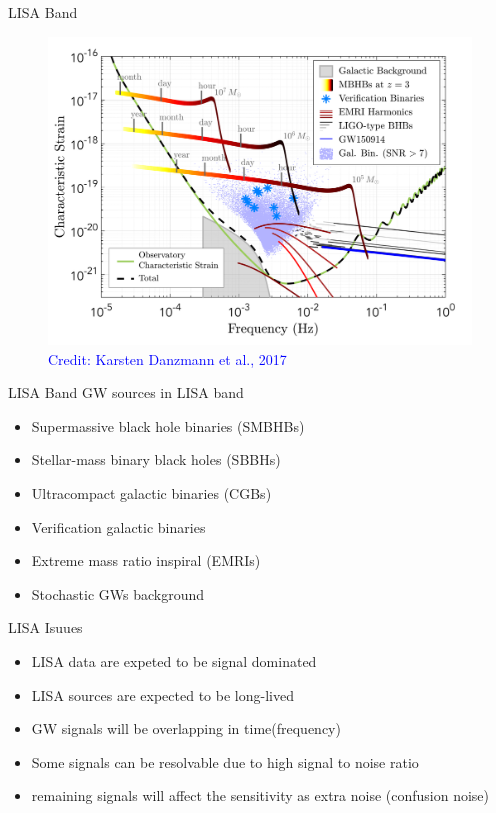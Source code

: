 \documentclass[pdf]{beamer}
\newcommand{\credit}[1]{\tiny{\textcolor{blue}{Credit: #1}}}
\begin{document}
\begin{frame}{LISA Band}
\begin{figure}
\includegraphics[scale=.2]{fig/observedLISA.png}
\caption*{\credit{Karsten Danzmann et al., 2017}}
\end{figure}
\end{frame}

\begin{frame}{LISA Band}
GW sources in LISA band
\begin{itemize}
\item Supermassive black hole binaries (SMBHBs)
\item Stellar-mass binary black holes (SBBHs)
\item Ultracompact galactic binaries (CGBs)
\item Verification galactic binaries
\item Extreme mass ratio inspiral (EMRIs)
\item Stochastic GWs background 
\end{itemize}
\end{frame}

\begin{frame}{LISA Isuues}
\begin{itemize}
\item LISA data are expeted to be signal dominated
\item LISA sources are expected to be long-lived
\item GW signals will be overlapping in time(frequency)
\pause
\item Some signals can be resolvable due to high signal to noise ratio
\pause
\item remaining signals will affect the sensitivity as extra noise (confusion noise)
\end{itemize}
\end{frame}
\end{document}
